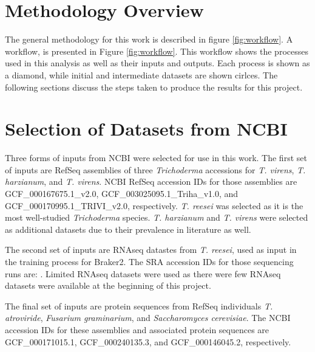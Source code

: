 \section{Methodology Overview}

The general methodology for this work is described in figure
\ref{fig:workflow}. A workflow, is presented in Figure
\ref{fig:workflow}. This workflow shows the processes used in this
analysis as well as their inputs and outputs. Each process is shown as
a diamond, while initial and intermediate datasets are shown
cirlces. The following sections discuss the steps taken to produce the
results for this project.


\section{Selection of Datasets from NCBI}
\label{met:datasets}

Three forms of inputs from NCBI were selected for use in this
work. The first set of inputs are RefSeq assemblies of three
\textit{Trichoderma} accessions for \textit{T. virens},
\textit{T. harzianum}, and \textit{T. virens}. NCBI RefSeq accession
IDs for those assemblies are GCF\_000167675.1\_v2.0,
GCF\_003025095.1\_Triha\_v1.0, and GCF\_000170995.1\_TRIVI\_v2.0,
respectively. \textit{T. reesei} was selected as it is the most
well-studied \textit{Trichoderma} species. \textit{T. harzianum} and
\textit{T. virens} were selected as additional datasets due to their
prevalence in literature as well.

The second set of inputs are RNAseq datastes from \textit{T. reesei},
used as input in the training process for Braker2. The SRA accession
IDs for those sequencing runs are: . Limited RNAseq datasets were used
as there were few RNAseq datasets were available at the beginning of
this project.

The final set of inputs are protein sequences from RefSeq individuals
\textit{T. atroviride}, \textit{Fusarium graminarium}, and
\textit{Saccharomyces cerevisiae}. The NCBI accession IDs for these
assemblies and associated protein sequences are GCF\_000171015.1,
GCF\_000240135.3, and GCF\_000146045.2, respectively.

